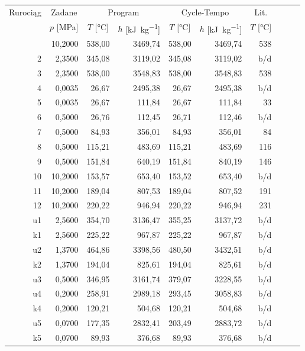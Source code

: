 \begin{longtable}{|*{10}{r|}}
	\hline
		\multirow{2}{*}{Rurociąg} &
		\multicolumn{1}{c|}{Zadane} &
		\multicolumn{2}{c|}{Program} &
		\multicolumn{2}{c|}{Cycle-Tempo} &
		\multicolumn{1}{c|}{Lit.} \\
	\cline{2-7}
		&
		\multicolumn{1}{c|}{$p$ [\si{\mega\pascal}]} &
		\multicolumn{1}{c|}{$T$ [\si{\degreeCelsius}]} &
		\multicolumn{1}{c|}{$h$ [\si{\kilo\joule\per\kilogram}]} &
		\multicolumn{1}{c|}{$T$ [\si{\degreeCelsius}]} &
		\multicolumn{1}{c|}{$h$ [\si{\kilo\joule\per\kilogram}]} &
		\multicolumn{1}{c|}{$T$ [\si{\degreeCelsius}]} \\
	\hline
	\endhead
	\hline
	\endfoot
		 1 & 10,2000 & 538,00 & 3469,74 & 538,00 & 3469,74 & 538 \\
		 2 &  2,3500 & 345,08 & 3119,02 & 345,08 & 3119,02 & b/d \\
		 3 &  2,3500 & 538,00 & 3548,83 & 538,00 & 3548,83 & 538 \\
		 4 &  0,0035 &  26,67 & 2495,38 &  26,67 & 2495,38 & b/d \\
		 5 &  0,0035 &  26,67 &  111,84 &  26,67 &  111,84 &  33 \\
		 6 &  0,5000 &  26,76 &  112,45 &  26,71 &  112,46 & b/d \\
		 7 &  0,5000 &  84,93 &  356,01 &  84,93 &  356,01 &  84 \\
		 8 &  0,5000 & 115,21 &  483,69 & 115,21 &  483,69 & 116 \\
		 9 &  0,5000 & 151,84 &  640,19 & 151,84 &  840,19 & 146 \\
		10 & 10,2000 & 153,57 &  653,40 & 153,52 &  653,40 & b/d \\
		11 & 10,2000 & 189,04 &  807,53 & 189,04 &  807,52 & 191 \\
		12 & 10,2000 & 220,22 &  946,94 & 220,22 &  946,94 & 231 \\
		u1 &  2,5600 & 354,70 & 3136,47 & 355,25 & 3137,72 & b/d \\
		k1 &  2,5600 & 225,22 &  967,87 & 225,22 &  967,87 & b/d \\
		u2 &  1,3700 & 464,86 & 3398,56 & 480,50 & 3432,51 & b/d \\
		k2 &  1,3700 & 194,04 &  825,61 & 194,04 &  825,61 & b/d \\
		u3 &  0,5000 & 346,95 & 3161,74 & 379,07 & 3228,55 & b/d \\
		u4 &  0,2000 & 258,91 & 2989,18 & 293,45 & 3058,83 & b/d \\
		k4 &  0,2000 & 120,21 &  504,68 & 120,21 &  504,68 & b/d \\
		u5 &  0,0700 & 177,35 & 2832,41 & 203,49 & 2883,72 & b/d \\
		k5 &  0,0700 &  89,93 &  376,68 &  89,93 &  376,68 & b/d \\
\end{longtable}

